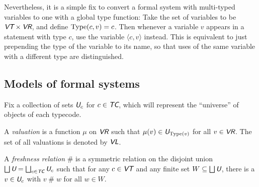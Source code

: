 \documentclass[runningheads,a4paper]{llncs}
\newcommand{\vr}{\textit{\textsf{VR}}} %
\newcommand{\tc}{\textit{\textsf{TC}}} %
\newcommand{\vt}{\textit{\textsf{VT}}} %
\newcommand{\vl}{\textit{\textsf{VL}}} %
\newcommand{\uv}{\textit{\textsf{U}}} %
\newcommand{\ang}[1]{\langle#1\rangle}
\newcommand{\type}{{\rm Type}}
\newcommand{\fresh}{\mathbin{\#}}
\begin{document}
Nevertheless, it is a simple fix to convert a formal system with multi-typed variables to one with a global type function: Take the set of variables to be $\vt\times\vr$, and define $\type(c,v)=c$. Then whenever a variable $v$ appears in a statement with type $c$, use the variable $\ang{c,v}$ instead. This is equivalent to just prepending the type of the variable to its name, so that uses of the same variable with a different type are distinguished. 

\subsection{Models of formal systems}\label{sec:model}
Fix a collection of sets $\uv_c$ for $c\in\tc$, which will represent the ``universe'' of objects of each typecode.
\begin{definition}
A {\em valuation} is a function $\mu$ on $\vr$ such that $\mu(v)\in\uv_{\type(v)}$ for all $v\in\vr$. The set of all valuations is denoted by $\vl$.
\end{definition}
\begin{definition}
A {\em freshness relation} $\fresh$ is a symmetric relation on the disjoint union $\bigsqcup\uv=\bigsqcup_{c\in\tc}\uv_c$ such that for any $c\in\vt$ and any finite set $W\subseteq\bigsqcup\uv$, there is a $v\in\uv_c$ with $v\fresh w$ for all $w\in W$.
\end{definition}
\end{document}
